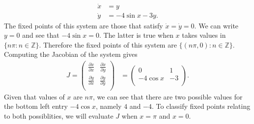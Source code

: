 \documentclass[10pt]{article}
\newcommand*{\px}[2]{\tfrac{\partial\dot #1}{\partial #2}}
\begin{document}
\begin{enumerate}
        \begin{align*}
          \dot x &= y \\
          \dot y &= -4\sin x - 3y.
        \end{align*}
        The fixed points of this system are those that satisfy
        $\dot x = \dot y = 0$. We can write $y = 0$ and see that
        $-4\sin x = 0$. The latter is true when $x$ takes values in
        $\{n\pi : n \in \mathbb{Z}\}$. Therefore the fixed points of this
        system are $\{(n\pi,0) : n \in \mathbb{Z}\}$.
        Computing the Jacobian of the system gives
        \begin{align*}
          J = \begin{pmatrix}
            \px{x}{x} & \px{x}{y} \\
            \px{y}{x} & \px{y}{y} \\
          \end{pmatrix} &=
          \begin{pmatrix}
            0 & 1 \\
            -4\cos x & -3 \\
          \end{pmatrix}.
        \end{align*}
      Given that values of $x$ are $n\pi$, we can see that there are two
      possible values for the bottom left entry $-4\cos x$, namely $4$ and
      $-4$. To classify fixed points relating to both possiblities, we will
      evaluate $J$ when $x = \pi$ and $x = 0$.


\end{enumerate}
\end{document}
